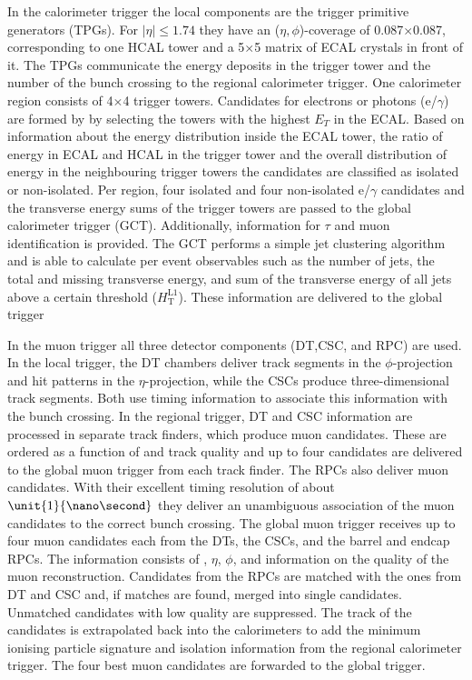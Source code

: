 In the calorimeter trigger the local components are the trigger primitive generators (TPGs). For $\vert \eta \vert \leq 1.74$ they have an ($\eta,\phi$)-coverage of 0.087$\times$0.087, corresponding to one HCAL tower and a 5$\times$5 matrix of ECAL crystals in front of it. The TPGs communicate the energy deposits in the trigger tower and the number of the bunch crossing to the regional calorimeter trigger. One calorimeter region consists of 4$\times$4 trigger towers. Candidates for electrons or photons (e/$\gamma$) are formed by by selecting the towers with the highest $E_T$ in the ECAL. Based on information about the energy distribution inside the ECAL tower, the ratio of energy in ECAL and HCAL in the trigger tower and the overall distribution of energy in the neighbouring trigger towers the candidates are classified as isolated or non-isolated. Per region, four isolated and four non-isolated e/$\gamma$ candidates and the transverse energy sums of the trigger towers are passed to the global calorimeter trigger (GCT). Additionally, information for $\tau$ and muon identification is provided. The GCT performs a simple jet clustering algorithm and is able to calculate per event observables such as the number of jets, the total and missing transverse energy, and sum of the transverse energy of all jets above a certain threshold ($H_{\mathrm{T}}^{\mathrm{L1}}$). These information are delivered to the global trigger

In the muon trigger all three detector components (DT,CSC, and RPC) are used. In the local trigger, the DT chambers deliver track segments in the $\phi$-projection and hit patterns in the $\eta$-projection, while the CSCs produce three-dimensional track segments. Both use timing information to associate this information with the bunch crossing. In the regional trigger, DT and CSC information are processed in separate track finders, which produce muon candidates. These are ordered as a function of \pt and track quality and up to four candidates are delivered to the global muon trigger from each track finder. The RPCs also deliver muon candidates. With their excellent timing resolution of about $\unit{1}{\nano\second}$ they deliver an unambiguous association of the muon candidates to the correct bunch crossing. The global muon trigger receives up to four muon candidates each from the DTs, the CSCs, and the barrel and endcap RPCs. The information consists of \pt, $\eta$, $\phi$, and information on the quality of the muon reconstruction. Candidates from the RPCs are matched with the ones from DT and CSC and, if matches are found, merged into single candidates. Unmatched candidates with low quality are suppressed. The track of the candidates is extrapolated back into the calorimeters to add the minimum ionising particle signature and isolation information from the regional calorimeter trigger. The four best muon candidates are forwarded to the global trigger. 

